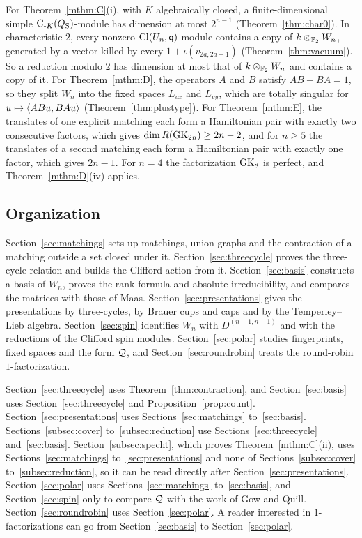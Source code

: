 For Theorem~\ref{mthm:C}(i), with $K$ algebraically closed, a finite-dimensional simple $\operatorname{Cl}_K(Q_{\mathrm S})$-module has dimension at most $2^{n-1}$ (Theorem~\ref{thm:char0}). In characteristic $2$, every nonzero $\operatorname{Cl}(U_n,\mathsf{q})$-module contains a copy of $k\otimes_{\mathbb{F}_2}W_n$, generated by a vector killed by every $1+\iota(v_{2a,2a+1})$ (Theorem~\ref{thm:vacuum}). So a reduction modulo $2$ has dimension at most that of $k\otimes_{\mathbb{F}_2}W_n$ and contains a copy of it. For Theorem~\ref{mthm:D}, the operators $A$ and $B$ satisfy $AB+BA=1$, so they split $W_n$ into the fixed spaces $L_{vx}$ and $L_{vy}$, which are totally singular for $u\mapsto\langle ABu,BAu\rangle$ (Theorem~\ref{thm:plustype}). For Theorem~\ref{mthm:E}, the translates of one explicit matching each form a Hamiltonian pair with exactly two consecutive factors, which gives $\dim R(\mathrm{GK}_{2n})\ge2n-2$, and for $n\ge5$ the translates of a second matching each form a Hamiltonian pair with exactly one factor, which gives $2n-1$. For $n=4$ the factorization $\mathrm{GK}_8$ is perfect, and Theorem~\ref{mthm:D}(iv) applies.

\subsection{Organization}

Section~\ref{sec:matchings} sets up matchings, union graphs and the contraction of a matching outside a set closed under it. Section~\ref{sec:threecycle} proves the three-cycle relation and builds the Clifford action from it. Section~\ref{sec:basis} constructs a basis of $W_n$, proves the rank formula and absolute irreducibility, and compares the matrices with those of Maas. Section~\ref{sec:presentations} gives the presentations by three-cycles, by Brauer cups and caps and by the Temperley--Lieb algebra. Section~\ref{sec:spin} identifies $W_n$ with $D^{(n+1,n-1)}$ and with the reductions of the Clifford spin modules. Section~\ref{sec:polar} studies fingerprints, fixed spaces and the form $\mathcal{Q}$, and Section~\ref{sec:roundrobin} treats the round-robin $1$-factorization. %

Section~\ref{sec:threecycle} uses Theorem~\ref{thm:contraction}, and Section~\ref{sec:basis} uses Section~\ref{sec:threecycle} and Proposition~\ref{prop:count}. Section~\ref{sec:presentations} uses Sections~\ref{sec:matchings} to~\ref{sec:basis}. Sections~\ref{subsec:cover} to~\ref{subsec:reduction} use Sections~\ref{sec:threecycle} and~\ref{sec:basis}. Section~\ref{subsec:specht}, which proves Theorem~\ref{mthm:C}(ii), uses Sections~\ref{sec:matchings} to~\ref{sec:presentations} and none of Sections~\ref{subsec:cover} to~\ref{subsec:reduction}, so it can be read directly after Section~\ref{sec:presentations}. Section~\ref{sec:polar} uses Sections~\ref{sec:matchings} to~\ref{sec:basis}, and Section~\ref{sec:spin} only to compare $\mathcal{Q}$ with the work of Gow and Quill. Section~\ref{sec:roundrobin} uses Section~\ref{sec:polar}. A reader interested in $1$-factorizations can go from Section~\ref{sec:basis} to Section~\ref{sec:polar}.
